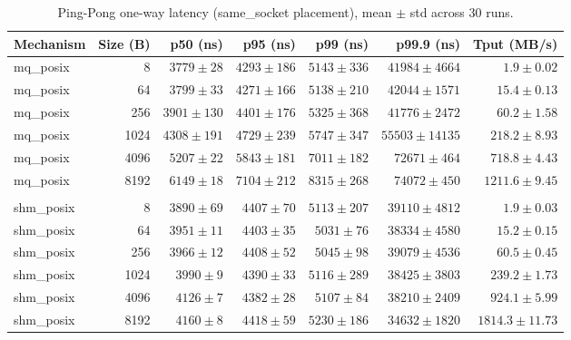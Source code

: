 \begin{table}[!t]
\centering
\caption{Ping-Pong one-way latency (same_socket placement), mean $\pm$ std across 30 runs.}
\label{tab:pp_latency_same_socket}
\begin{tabular}{lrrrrrr}
\toprule
\textbf{Mechanism} & \textbf{Size (B)} & \textbf{p50 (ns)} & \textbf{p95 (ns)} & \textbf{p99 (ns)} & \textbf{p99.9 (ns)} & \textbf{Tput (MB/s)} \\
\midrule
mq_posix & 8 & $3779 \pm 28$ & $4293 \pm 186$ & $5143 \pm 336$ & $41984 \pm 4664$ & $1.9 \pm 0.02$ \\
mq_posix & 64 & $3799 \pm 33$ & $4271 \pm 166$ & $5138 \pm 210$ & $42044 \pm 1571$ & $15.4 \pm 0.13$ \\
mq_posix & 256 & $3901 \pm 130$ & $4401 \pm 176$ & $5325 \pm 368$ & $41776 \pm 2472$ & $60.2 \pm 1.58$ \\
mq_posix & 1024 & $4308 \pm 191$ & $4729 \pm 239$ & $5747 \pm 347$ & $55503 \pm 14135$ & $218.2 \pm 8.93$ \\
mq_posix & 4096 & $5207 \pm 22$ & $5843 \pm 181$ & $7011 \pm 182$ & $72671 \pm 464$ & $718.8 \pm 4.43$ \\
mq_posix & 8192 & $6149 \pm 18$ & $7104 \pm 212$ & $8315 \pm 268$ & $74072 \pm 450$ & $1211.6 \pm 9.45$ \\
 &  &  &  &  &  &  \\
shm_posix & 8 & $3890 \pm 69$ & $4407 \pm 70$ & $5113 \pm 207$ & $39110 \pm 4812$ & $1.9 \pm 0.03$ \\
shm_posix & 64 & $3951 \pm 11$ & $4403 \pm 35$ & $5031 \pm 76$ & $38334 \pm 4580$ & $15.2 \pm 0.15$ \\
shm_posix & 256 & $3966 \pm 12$ & $4408 \pm 52$ & $5045 \pm 98$ & $39079 \pm 4536$ & $60.5 \pm 0.45$ \\
shm_posix & 1024 & $3990 \pm 9$ & $4390 \pm 33$ & $5116 \pm 289$ & $38425 \pm 3803$ & $239.2 \pm 1.73$ \\
shm_posix & 4096 & $4126 \pm 7$ & $4382 \pm 28$ & $5107 \pm 84$ & $38210 \pm 2409$ & $924.1 \pm 5.99$ \\
shm_posix & 8192 & $4160 \pm 8$ & $4418 \pm 59$ & $5230 \pm 186$ & $34632 \pm 1820$ & $1814.3 \pm 11.73$ \\
\bottomrule
\end{tabular}
\end{table}
